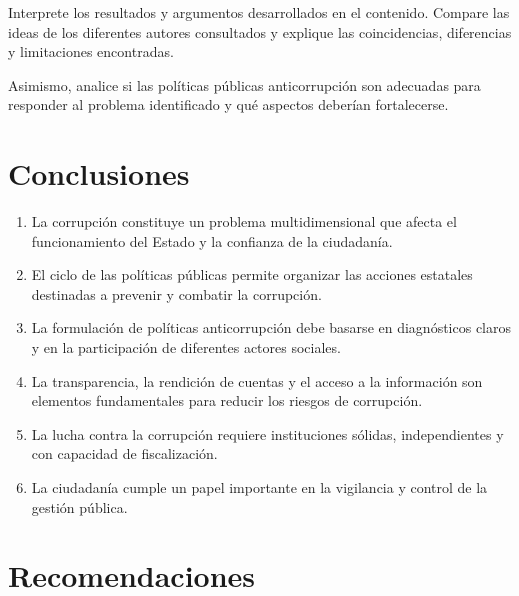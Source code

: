 \documentclass[12pt,a4paper]{article}
\begin{document}
Interprete los resultados y argumentos desarrollados en el contenido. Compare las ideas de los diferentes autores consultados y explique las coincidencias, diferencias y limitaciones encontradas.

Asimismo, analice si las políticas públicas anticorrupción son adecuadas para responder al problema identificado y qué aspectos deberían fortalecerse.

\section{Conclusiones}

\begin{enumerate}[label=\arabic*.]
    \item La corrupción constituye un problema multidimensional que afecta el funcionamiento del Estado y la confianza de la ciudadanía.
    
    \item El ciclo de las políticas públicas permite organizar las acciones estatales destinadas a prevenir y combatir la corrupción.
    
    \item La formulación de políticas anticorrupción debe basarse en diagnósticos claros y en la participación de diferentes actores sociales.
    
    \item La transparencia, la rendición de cuentas y el acceso a la información son elementos fundamentales para reducir los riesgos de corrupción.
    
    \item La lucha contra la corrupción requiere instituciones sólidas, independientes y con capacidad de fiscalización.
    
    \item La ciudadanía cumple un papel importante en la vigilancia y control de la gestión pública.
\end{enumerate}

\section{Recomendaciones}
\end{document}
